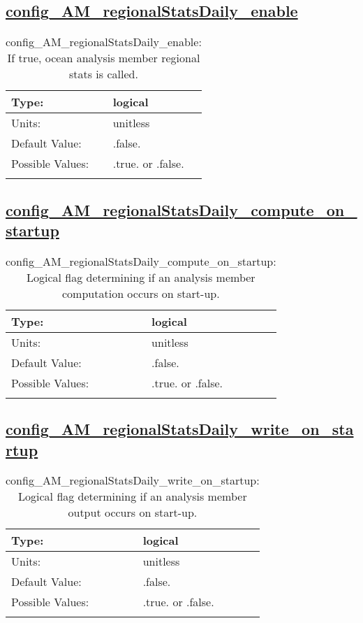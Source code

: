 \subsection[config\_AM\_regionalStatsDaily\_enable]{\hyperref[sec:nm_tab_AM_regionalStatsDaily]{config\_AM\_regionalStatsDaily\_enable}}
\label{subsec:nm_sec_config_AM_regionalStatsDaily_enable}
\begin{center}
\begin{longtable}{| p{2.0in} || p{4.0in} |}
    \hline
    Type: & logical \\
    \hline
    Units: & \si{unitless} \\
    \hline
    Default Value: & .false. \\
    \hline
    Possible Values: & .true. or .false. \\
    \hline
    \caption{config\_AM\_regionalStatsDaily\_enable: If true, ocean analysis member regional stats is called.}
\end{longtable}
\end{center}
\subsection[config\_AM\_regionalStatsDaily\_compute\_on\_startup]{\hyperref[sec:nm_tab_AM_regionalStatsDaily]{config\_AM\_regionalStatsDaily\_compute\_on\_startup}}
\label{subsec:nm_sec_config_AM_regionalStatsDaily_compute_on_startup}
\begin{center}
\begin{longtable}{| p{2.0in} || p{4.0in} |}
    \hline
    Type: & logical \\
    \hline
    Units: & \si{unitless} \\
    \hline
    Default Value: & .false. \\
    \hline
    Possible Values: & .true. or .false. \\
    \hline
    \caption{config\_AM\_regionalStatsDaily\_compute\_on\_startup: Logical flag determining if an analysis member computation occurs on start-up.}
\end{longtable}
\end{center}
\subsection[config\_AM\_regionalStatsDaily\_write\_on\_startup]{\hyperref[sec:nm_tab_AM_regionalStatsDaily]{config\_AM\_regionalStatsDaily\_write\_on\_startup}}
\label{subsec:nm_sec_config_AM_regionalStatsDaily_write_on_startup}
\begin{center}
\begin{longtable}{| p{2.0in} || p{4.0in} |}
    \hline
    Type: & logical \\
    \hline
    Units: & \si{unitless} \\
    \hline
    Default Value: & .false. \\
    \hline
    Possible Values: & .true. or .false. \\
    \hline
    \caption{config\_AM\_regionalStatsDaily\_write\_on\_startup: Logical flag determining if an analysis member output occurs on start-up.}
\end{longtable}
\end{center}
